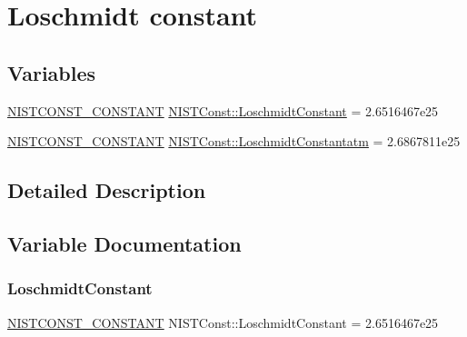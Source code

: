 \hypertarget{group___n_i_s_t_const-_loschmidt_constant}{}\section{Loschmidt constant}
\label{group___n_i_s_t_const-_loschmidt_constant}
\subsection*{Variables}
\begin{DoxyCompactItemize}
\item 
\mbox{\hyperlink{_n_i_s_t_const_8hpp_a2b0fc1d7452373f816175dd86ce26729}{N\+I\+S\+T\+C\+O\+N\+S\+T\+\_\+\+C\+O\+N\+S\+T\+A\+NT}} \mbox{\hyperlink{group___n_i_s_t_const-_loschmidt_constant_ga513d27c989dc4f6f91e3aa37ca018d5a}{N\+I\+S\+T\+Const\+::\+Loschmidt\+Constant}} = 2.\+6516467e25
\item 
\mbox{\hyperlink{_n_i_s_t_const_8hpp_a2b0fc1d7452373f816175dd86ce26729}{N\+I\+S\+T\+C\+O\+N\+S\+T\+\_\+\+C\+O\+N\+S\+T\+A\+NT}} \mbox{\hyperlink{group___n_i_s_t_const-_loschmidt_constant_gae68f5d2d04353bd4cf30faa8cb935734}{N\+I\+S\+T\+Const\+::\+Loschmidt\+Constantatm}} = 2.\+6867811e25
\end{DoxyCompactItemize}


\subsection{Detailed Description}


\subsection{Variable Documentation}
\mbox{\label{group___n_i_s_t_const-_loschmidt_constant_ga513d27c989dc4f6f91e3aa37ca018d5a}} 
\subsubsection{\texorpdfstring{Loschmidt\+Constant}{LoschmidtConstant}}
{\footnotesize\ttfamily \mbox{\hyperlink{_n_i_s_t_const_8hpp_a2b0fc1d7452373f816175dd86ce26729}{N\+I\+S\+T\+C\+O\+N\+S\+T\+\_\+\+C\+O\+N\+S\+T\+A\+NT}} N\+I\+S\+T\+Const\+::\+Loschmidt\+Constant = 2.\+6516467e25}

